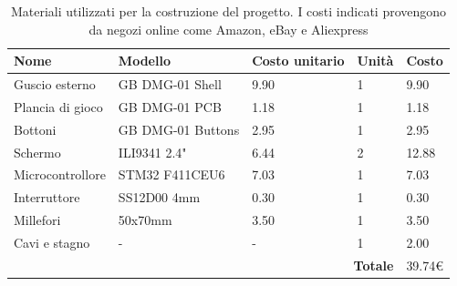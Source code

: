\documentclass[hidelinks,12pt]{article}
\begin{document}
\begin{center}
	\begin{table}[h]
		\centering
		\begin{tabular}{|llll|l|}
			\hline
			\multicolumn{1}{|l|}{\textbf{Nome}}    & \multicolumn{1}{l|}{\textbf{Modello}}  & \multicolumn{1}{l|}{\textbf{Costo unitario}} & \textbf{Unità} & \textbf{Costo} \\ \hline
			\multicolumn{1}{|l|}{Guscio esterno}   & \multicolumn{1}{l|}{GB DMG-01 Shell}   & \multicolumn{1}{l|}{9.90}                    & 1              & 9.90           \\ \hline
			\multicolumn{1}{|l|}{Plancia di gioco} & \multicolumn{1}{l|}{GB DMG-01 PCB}     & \multicolumn{1}{l|}{1.18}                    & 1              & 1.18           \\ \hline
			\multicolumn{1}{|l|}{Bottoni}          & \multicolumn{1}{l|}{GB DMG-01 Buttons} & \multicolumn{1}{l|}{2.95}                    & 1              & 2.95           \\ \hline
			\multicolumn{1}{|l|}{Schermo}          & \multicolumn{1}{l|}{ILI9341 2.4"}      & \multicolumn{1}{l|}{6.44}                    & 2              & 12.88          \\ \hline
			\multicolumn{1}{|l|}{Microcontrollore} & \multicolumn{1}{l|}{STM32 F411CEU6}    & \multicolumn{1}{l|}{7.03}                    & 1              & 7.03           \\ \hline
			\multicolumn{1}{|l|}{Interruttore}     & \multicolumn{1}{l|}{SS12D00 4mm}       & \multicolumn{1}{l|}{0.30}                    & 1              & 0.30           \\ \hline
			\multicolumn{1}{|l|}{Millefori}        & \multicolumn{1}{l|}{50x70mm}           & \multicolumn{1}{l|}{3.50}                    & 1              & 3.50           \\ \hline
			\multicolumn{1}{|l|}{Cavi e stagno}    & \multicolumn{1}{l|}{-}                 & \multicolumn{1}{l|}{-}                       & 1              & 2.00           \\ \hline
			\multicolumn{4}{|r|}{\textbf{Totale}}  & 39.74€                                                                                                                  \\ \hline
		\end{tabular}
		\caption{
			Materiali utilizzati per la costruzione del progetto. I costi indicati
			provengono da negozi online come Amazon, eBay e Aliexpress
		}
	\end{table}
\end{center}
\end{document}
